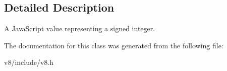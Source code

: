 \subsection{Detailed Description}
A Java\+Script value representing a signed integer. 

The documentation for this class was generated from the following file\+:\begin{DoxyCompactItemize}
\item 
v8/include/v8.\+h\end{DoxyCompactItemize}
